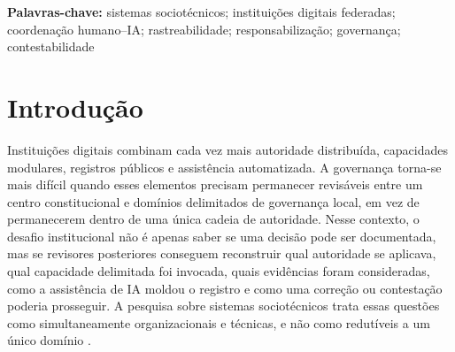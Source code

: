 \documentclass[11pt]{article}
\begin{document}
\begin{abstract}
Instituições digitais assistidas por humanos e IA tornam-se difíceis de
governar quando restrições constitucionais, domínios delimitados de governança
local, capacidades modulares e obrigações de revisão precisam ser coordenados
no mesmo ambiente decisório. Literaturas adjacentes sobre sistemas
sociotécnicos, governança descentralizada, proveniência, algoritmos
responsabilizáveis, contestabilidade e interação humano--IA oferecem
componentes com escopos distintos para examinar esse problema. Este artigo
apresenta o Axodus como uma integração proposta desses componentes: uma
arquitetura conceitual em estágio de protótipo para esse contexto. Sua
contribuição central é um modelo de seis camadas orientado à governança que
relaciona um centro constitucional, domínios delimitados de governança local,
capacidades institucionais modulares, evidência e proveniência, assistência de
IA delimitada e controles de risco ou contestabilidade. As seis camadas são
apresentadas como uma decomposição conceitual defensável, não como estrutura
necessária, mínima, unicamente correta ou universalmente suficiente.
Rastreabilidade e reconstrutibilidade podem apoiar responsabilização
(\emph{accountability}) e contestabilidade, mas não estabelecem nenhuma dessas
propriedades de forma independente. O Axodus é descrito somente como um modelo
conceitual em estágio de protótipo; o artigo não relata implantação, validação
empírica, uso institucional observado ou prontidão operacional.
\end{abstract}

\noindent\textbf{Palavras-chave:} sistemas sociotécnicos; instituições
digitais federadas; coordenação humano--IA; rastreabilidade;
responsabilização; governança; contestabilidade

\section{Introdução}

Instituições digitais combinam cada vez mais autoridade distribuída,
capacidades modulares, registros públicos e assistência automatizada. A
governança torna-se mais difícil quando esses elementos precisam permanecer
revisáveis entre um centro constitucional e domínios delimitados de governança
local, em vez de permanecerem dentro de uma única cadeia de autoridade. Nesse
contexto, o desafio institucional não é apenas saber se uma decisão pode ser
documentada, mas se revisores posteriores conseguem reconstruir qual
autoridade se aplicava, qual capacidade delimitada foi invocada, quais
evidências foram consideradas, como a assistência de IA moldou o registro e
como uma correção ou contestação poderia prosseguir. A pesquisa sobre sistemas
sociotécnicos trata essas questões como simultaneamente organizacionais e
técnicas, e não como redutíveis a um único domínio
\citep{baxter2011sociotechnical}.
\end{document}
